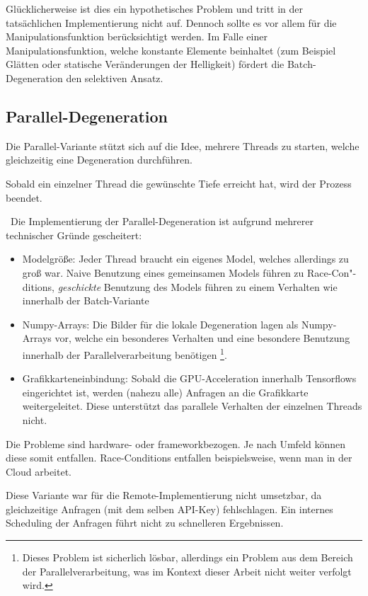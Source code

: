 Glücklicherweise ist dies ein hypothetisches Problem und tritt in der tatsächlichen Implementierung nicht auf. Dennoch sollte es vor allem für die Manipulationsfunktion berücksichtigt werden. Im Falle einer Manipulationsfunktion, welche konstante Elemente beinhaltet (zum Beispiel Glätten oder statische Veränderungen der Helligkeit) fördert die Batch-Degeneration den selektiven Ansatz.
\subsection{Parallel-Degeneration}
Die Parallel-Variante stützt sich auf die Idee, mehrere Threads zu starten, welche gleichzeitig eine Degeneration durchführen.

Sobald ein einzelner Thread die gewünschte Tiefe erreicht hat, wird der Prozess beendet. 

~\newline Die Implementierung der Parallel-Degeneration ist aufgrund mehrerer technischer Gründe gescheitert: 

\begin{itemize}
	\item Modelgröße: Jeder Thread braucht ein eigenes Model, welches allerdings zu groß war. Naive Benutzung eines gemeinsamen Models führen zu Race-Con"-ditions, \textit{geschickte} Benutzung des Models führen zu einem Verhalten wie innerhalb der Batch-Variante
	\item Numpy-Arrays: Die Bilder für die lokale Degeneration lagen als Numpy-Arrays vor, welche ein besonderes Verhalten und eine besondere Benutzung innerhalb der Parallelverarbeitung benötigen \footnote{Dieses Problem ist sicherlich lösbar, allerdings ein Problem aus dem Bereich der Parallelverarbeitung, was im Kontext dieser Arbeit nicht weiter verfolgt wird.}. 
	\item Grafikkarteneinbindung: Sobald die GPU-Acceleration innerhalb Tensorflows eingerichtet ist, werden (nahezu alle) Anfragen an die Grafikkarte weitergeleitet. Diese unterstützt das parallele Verhalten der einzelnen Threads nicht. 
\end{itemize} 

Die Probleme sind hardware- oder frameworkbezogen. Je nach Umfeld können diese somit entfallen. Race-Conditions entfallen beispielsweise, wenn man in der Cloud arbeitet.

Diese Variante war für die Remote-Implementierung nicht umsetzbar, da gleichzeitige Anfragen (mit dem selben API-Key) fehlschlagen. Ein internes Scheduling der Anfragen führt nicht zu schnelleren Ergebnissen. 
